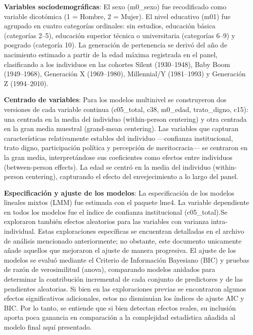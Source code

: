 \documentclass[
  spanish,
  a4paper,
  oneside]{scrbook}
\begin{document}
\textbf{Variables sociodemográficas}: El sexo (m0\_sexo) fue
recodificado como variable dicotómica (1 = Hombre, 2 = Mujer). El nivel
educativo (m01) fue agrupado en cuatro categorías ordinales: sin
estudios, educación básica (categorías 2--5), educación superior técnica
o universitaria (categorías 6--9) y posgrado (categoría 10). La
generación de pertenencia se derivó del año de nacimiento estimado a
partir de la edad máxima registrada en el panel, clasificando a los
individuos en las cohortes Silent (1930--1948), Baby Boom (1949--1968),
Generación X (1969--1980), Millennial/Y (1981--1993) y Generación Z
(1994--2010).

\textbf{Centrado de variables}: Para los modelos multinivel se
construyeron dos versiones de cada variable continua (c05\_total, c38,
m0\_edad, trato\_digno, c15): una centrada en la media del individuo
(within-person centering) y otra centrada en la gran media muestral
(grand-mean centering). Las variables que capturan características
relativamente estables del individuo ---confianza institucional, trato
digno, participación política y percepción de meritocracia--- se
centraron en la gran media, interpretándose sus coeficientes como
efectos entre individuos (between-person effects). La edad se centró en
la media del individuo (within-person centering), capturando el efecto
del envejecimiento a lo largo del panel.

\textbf{Especificación y ajuste de los modelos}: La especificación de
los modelos lineales mixtos (LMM) fue estimada con el paquete lme4. La
variable dependiente en todos los modelos fue el índice de confianza
institucional (c05\_total).Se exploraron también efectos aleatorios para
las variables con varianza intra-individual. Estas exploraciones
específicas se encuentran detalladas en el archivo de análisis
mencionado anteriormente; no obstante, este documento unicamente añade
aquellos que mejoraron el ajuste de manera progresiva. El ajuste de los
modelos se evaluó mediante el Criterio de Información Bayesiano (BIC) y
pruebas de razón de verosimilitud (anova), comparando modelos anidados
para determinar la contribución incremental de cada conjunto de
predictores y de las pendientes aleatorias. Si bien en las exploraciones
previas se encontraron algunos efectos significativos adicionales, estos
no disminuían los índices de ajuste AIC y BIC. Por lo tanto, se entiende
que si bien detectan efectos reales, su inclusión aporta poca ganancia
en comparación a la complejidad estadística añadida al modelo final aquí
presentado.
\end{document}
